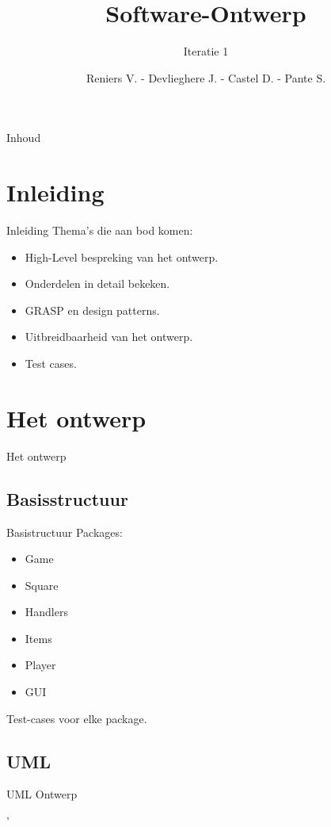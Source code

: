 \documentclass[t]{beamer}
\title{Software-Ontwerp}
\subtitle{Iteratie 1}
\author{Reniers V. - Devlieghere J. - Castel D. - Pante S.}
\institute{KU Leuven}
\begin{document}
\frame{\titlepage} 
\begin{frame}{Inhoud}
\begin{multicols}{2}
\tableofcontents
\end{multicols}
\end{frame}



\section{Inleiding} 
\begin{frame}{Inleiding} 
Thema's die aan bod komen:
\begin{itemize}
	\item High-Level bespreking van het ontwerp.
	\item Onderdelen in detail bekeken.
	\item GRASP en design patterns.
	\item Uitbreidbaarheid van het ontwerp.
	\item Test cases.
\end{itemize}
\end{frame}

\section{Het ontwerp}
\begin{frame}{Het ontwerp}
\begin{multicols}{2}
\tableofcontents[currentsection]
\end{multicols}
\end{frame}

\subsection{Basisstructuur}
\begin{frame}{Basistructuur}
Packages:
\begin{itemize}
	\item Game
	\item Square
	\item Handlers
	\item Items
	\item Player
	\item GUI
\end{itemize}
Test-cases voor elke package.
\end{frame}


\subsection{UML}
\begin{frame}{UML Ontwerp}

'%

\end{frame}
\end{document}
